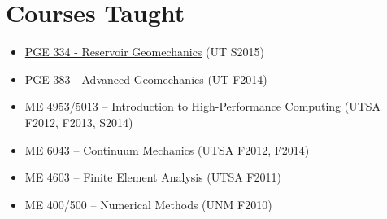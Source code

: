 \section*{Courses Taught}

  \begin{itemize}
      \item \href{http://johnfoster.pge.utexas.edu/PGE334-ResGeomechanics/}{PGE 334 - Reservoir Geomechanics} (UT S2015)
      \item \href{http://johnfoster.pge.utexas.edu/PGE383-AdvGeomechanics/}{PGE 383 - Advanced Geomechanics} (UT F2014)
      \item ME 4953/5013 -- Introduction to High-Performance Computing (UTSA F2012, F2013, S2014)
      \item ME 6043 -- Continuum Mechanics (UTSA F2012, F2014)
      \item ME 4603 -- Finite Element Analysis (UTSA F2011)
      \item ME 400/500 -- Numerical Methods (UNM F2010)
  \end{itemize}

